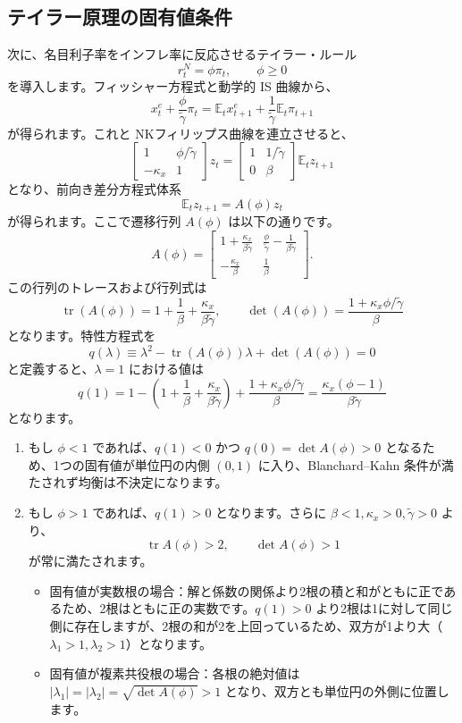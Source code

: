 \documentclass[
  japanese,
  lualatex,
  ja=standard,
  12pt,
  a4paper]{ltjsarticle}
\providecommand{\tightlist}{%
  \setlength{\itemsep}{0pt}\setlength{\parskip}{0pt}}
\begin{document}
\subsection{テイラー原理の固有値条件}\label{ux30c6ux30a4ux30e9ux30fcux539fux7406ux306eux56faux6709ux5024ux6761ux4ef6}

次に、名目利子率をインフレ率に反応させるテイラー・ルール \[
r_t^N=\phi\pi_t,
\qquad
\phi\geq0
\] を導入します。フィッシャー方程式と動学的 IS 曲線から、 \[
x_t^e+\frac{\phi}{\tilde{\gamma}}\pi_t
=
\mathbb{E}_t x_{t+1}^e
+\frac{1}{\tilde{\gamma}}\mathbb{E}_t\pi_{t+1}
\] が得られます。これと NKフィリップス曲線を連立させると、 \[
\begin{bmatrix}
1 & \phi/\tilde{\gamma}\\
-\kappa_x & 1
\end{bmatrix}
z_t
=
\begin{bmatrix}
1 & 1/\tilde{\gamma}\\
0 & \beta
\end{bmatrix}
\mathbb{E}_t z_{t+1}
\] となり、前向き差分方程式体系 \[
\mathbb{E}_t z_{t+1}=A(\phi)z_t
\] が得られます。ここで遷移行列 \(A(\phi)\) は以下の通りです。 \[
A(\phi)
=
\begin{bmatrix}
1+\frac{\kappa_x}{\beta\tilde{\gamma}}
&
\frac{\phi}{\tilde{\gamma}}-\frac{1}{\beta\tilde{\gamma}}\\
-\frac{\kappa_x}{\beta}
&
\frac{1}{\beta}
\end{bmatrix}.
\] この行列のトレースおよび行列式は \[
\operatorname{tr}(A(\phi))
=
1+\frac{1}{\beta}
+\frac{\kappa_x}{\beta\tilde{\gamma}},
\qquad
\det(A(\phi))
=
\frac{1+\kappa_x\phi/\tilde{\gamma}}{\beta}
\] となります。特性方程式を \[
q(\lambda)
\equiv
\lambda^2-\operatorname{tr}(A(\phi))\lambda+\det(A(\phi))=0
\] と定義すると、\(\lambda=1\) における値は \[
q(1)
=
1 - \left(1+\frac{1}{\beta}+\frac{\kappa_x}{\beta\tilde{\gamma}}\right) + \frac{1+\kappa_x\phi/\tilde{\gamma}}{\beta}
=
\frac{\kappa_x(\phi-1)}{\beta\tilde{\gamma}}
\] となります。

\begin{enumerate}
\def\labelenumi{\arabic{enumi}.}
\tightlist
\item
  もし \(\phi<1\) であれば、\(q(1)<0\) かつ \(q(0)=\det A(\phi)>0\)
  となるため、1つの固有値が単位円の内側 \((0, 1)\)
  に入り、Blanchard--Kahn 条件が満たされず均衡は不決定になります。
\item
  もし \(\phi>1\) であれば、\(q(1)>0\) となります。さらに
  \(\beta<1, \kappa_x>0, \tilde{\gamma}>0\) より、 \[
  \operatorname{tr}A(\phi) > 2,
  \qquad
  \det A(\phi) > 1
  \] が常に満たされます。

  \begin{itemize}
  \tightlist
  \item
    固有値が実数根の場合：解と係数の関係より2根の積と和がともに正であるため、2根はともに正の実数です。\(q(1)>0\)
    より2根は1に対して同じ側に存在しますが、2根の和が2を上回っているため、双方が1より大（\(\lambda_1>1, \lambda_2>1\)）となります。
  \item
    固有値が複素共役根の場合：各根の絶対値は
    \(|\lambda_1|=|\lambda_2|=\sqrt{\det A(\phi)} > 1\)
    となり、双方とも単位円の外側に位置します。
  \end{itemize}
\end{enumerate}
\end{document}

